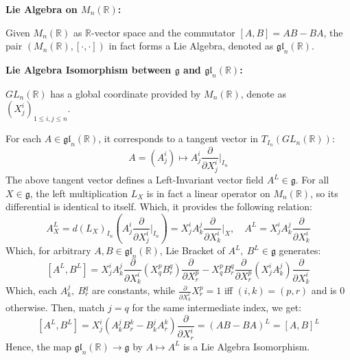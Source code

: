 \documentclass[20pt,margin=0.9in,innermargin=-4.5in,blockverticalspace=-0.25in]{tikzposter}
\begin{document}
\begin{columns}
{\begin{exampleBox}
            \textbf{Lie Algebra on $M_n(\mathbb{R})$:}

            Given $M_n(\mathbb{R})$ as $\mathbb{R}$-vector space and the commutator $[A,B]=AB-BA$, the pair $(M_n(\mathbb{R}),[\cdot,\cdot])$ in fact forms a Lie Algebra, denoted as $\mathfrak{gl}_n(\mathbb{R})$.

            

            \hfil

            \textbf{Lie Algebra Isomorphism between $\mathfrak{g}$ and $\mathfrak{gl}_n(\mathbb{R})$:}

            $GL_n(\mathbb{R})$ has a global coordinate provided by $M_n(\mathbb{R})$, denote as $(X^i_j)_{1\leq i,j\leq n}$.
            
            For each $A\in \mathfrak{gl}_n(\mathbb{R})$, it corresponds to a tangent vector in $T_{I_n}(GL_n(\mathbb{R}))$:
            $$A = (A^i_j)\mapsto A^i_j\frac{\partial}{\partial X^i_j}\bigg|_{I_n}$$
            The above tangent vector defines a Left-Invariant vector field $A^L\in \mathfrak{g}$. For all $X\in \mathfrak{g}$, the left multiplication $L_X$ is in fact a linear operator on $M_n(\mathbb{R})$, so its differential is identical to itself. Which, it provides the following relation:
            $$A^L_X=d(L_X)_{I_n}\left(A^i_j\frac{\partial}{\partial X^i_j}\bigg|_{I_n}\right) = X^i_j A^j_k\frac{\partial}{\partial X^i_k}\bigg|_{X},\quad A^L=X^i_j A^j_k\frac{\partial}{\partial X^i_k}$$
            Which, for arbitrary $A,B\in\mathfrak{gl}_n(\mathbb{R})$, Lie Bracket of $A^L,\ B^L\in\mathfrak{g}$ generates:
            $$\left[A^L,B^L\right] = X^i_jA^j_k\frac{\partial}{\partial X^i_k}(X^p_qB^q_r)\frac{\partial}{\partial X^p_r}-X^p_qB^q_r\frac{\partial}{\partial X^p_r}(X^i_jA^j_k)\frac{\partial}{\partial X^i_k}$$
            Which, each $A^j_k,\ B^q_r$ are constants, while $\frac{\partial}{\partial X^i_k}X^p_r = 1$ iff $(i,k)=(p,r)$ and is $0$ otherwise. Then, match $j=q$ for the same intermediate index, we get:
            $$\left[A^L,B^L\right] = X^i_j(A^j_kB^k_r-B^j_kA^k_r)\frac{\partial}{\partial X^i_r} = (AB-BA)^L=[A,B]^L$$
            Hence, the map $\mathfrak{gl}_n(\mathbb{R})\rightarrow \mathfrak{g}$ by $A\mapsto A^L$ is a Lie Algebra Isomorphism.
        \end{exampleBox}
    }

\end{columns}
\end{document}
